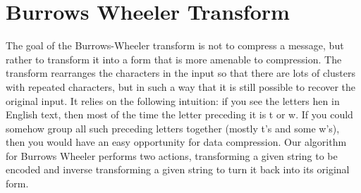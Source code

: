 \documentclass[12pt]{article}
\begin{document}
\begin{table}[H]
	\centering
\end{table}


\newpage

\section{Burrows Wheeler Transform}
The goal of the Burrows-Wheeler transform is not to compress a message, but
rather to transform it into a form that is more amenable to compression. The
transform rearranges the characters in the input so that there are lots of
clusters with repeated characters, but in such a way that it is still possible
to recover the original input. It relies on the following intuition: if you
see the letters hen in English text, then most of the time the letter preceding
it is t or w. If you could somehow group all such preceding letters together
(mostly t's and some w's), then you would have an easy opportunity for data
compression. Our algorithm for Burrows Wheeler performs two actions, transforming
a given string to be encoded and inverse transforming a given string to turn
it back into its original form.
\end{document}
